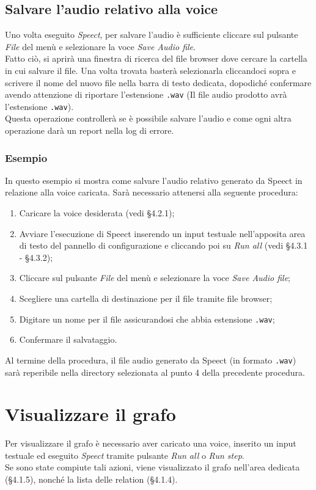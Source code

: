 \documentclass[openany,12pt,a4paper]{report}
\begin{document}
	\subsection{Salvare l'audio relativo alla voice}
	Uno volta eseguito \textit{Speect}, per salvare l'audio è sufficiente cliccare sul pulsante \textit{File} del menù e selezionare la voce \textit{Save Audio file}.\\
	Fatto ciò, si aprirà una finestra di ricerca del file browser dove cercare la cartella in cui salvare il file. Una volta trovata basterà selezionarla cliccandoci sopra e scrivere il nome del nuovo file nella barra di testo dedicata, dopodiché confermare avendo attenzione di riportare l'estensione \verb|.wav| (Il file audio prodotto avrà l'estensione \verb|.wav|).\\
	Questa operazione controllerà se è possibile salvare l'audio e come ogni altra operazione darà un report nella log di errore.
	
	\subsubsection*{Esempio}
	
	In questo esempio si mostra come salvare l'audio relativo generato da Speect in relazione alla voice caricata. Sarà necessario attenersi alla seguente procedura:
	
	\begin{enumerate}
		\item Caricare la voice desiderata (vedi §4.2.1);
		\item Avviare l'esecuzione di Speect inserendo un input testuale nell'apposita area di testo del pannello di configurazione e cliccando poi su \textit{Run all} (vedi §4.3.1 - §4.3.2);
		\item Cliccare sul pulsante \textit{File} del menù e selezionare la voce \textit{Save Audio file}; 
		\item Scegliere una cartella di destinazione per il file tramite file browser;
		\item Digitare un nome per il file assicurandosi che abbia estensione \verb|.wav|;
		\item Confermare il salvataggio.
	\end{enumerate} 
	
	\noindent Al termine della procedura, il file audio generato da Speect (in formato \verb|.wav|) sarà reperibile nella directory selezionata al punto 4 della precedente procedura.
	
	\section{Visualizzare il grafo}
	Per visualizzare il grafo è necessario aver caricato una voice, inserito un input testuale ed eseguito \textit{Speect} tramite pulsante \textit{Run all} o \textit{Run step}.\\
	Se sono state compiute tali azioni, viene visualizzato il grafo nell'area dedicata (§4.1.5), nonché la lista delle relation (§4.1.4).
	
\end{document}
